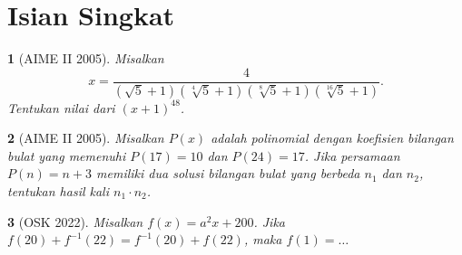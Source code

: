 \documentclass[11pt,a4paper,DIV=12]{scrartcl}
\theoremstyle{justnumber}
\newtheorem{problem}{}
\begin{document}
\section*{Isian Singkat}
\begin{problem}[AIME II 2005]
  Misalkan
  \[
    x = \frac{4}{(\sqrt{5}+1)(\sqrt[4]{5}+1)(\sqrt[8]{5}+1)(\sqrt[16]{5}+1)}.
  \]
  Tentukan nilai dari $(x+1)^{48}$.
\end{problem}

\begin{problem}[AIME II 2005]
  Misalkan $P(x)$ adalah polinomial dengan koefisien bilangan bulat yang memenuhi $P(17) = 10$ dan $P(24) = 17$. Jika persamaan $P(n) = n + 3$ memiliki dua solusi bilangan bulat yang berbeda $n_1$ dan $n_2$, tentukan hasil kali $n_1 \cdot n_2$.
\end{problem}

\begin{problem}[OSK 2022]
  Misalkan $f(x) = a^2 x + 200$. Jika $f(20) + f^{-1}(22) = f^{-1}(20) + f(22)$, maka $f(1) = \ldots$
\end{problem}
\end{document}
